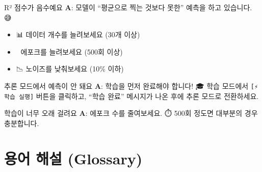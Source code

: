 \documentclass[11pt,a4paper]{article}
\begin{document}
\begin{faqbox}{R² 점수가 음수예요}
\textbf{A}: 모델이 ``평균으로 찍는 것보다 못한'' 예측을 하고 있습니다. 😅
\begin{itemize}
    \item 📊 데이터 개수를 늘려보세요 (30개 이상)
    \item 🔄 에포크를 늘려보세요 (500회 이상)
    \item 📉 노이즈를 낮춰보세요 (10\% 이하)
\end{itemize}
\end{faqbox}

\begin{faqbox}{추론 모드에서 예측이 안 돼요}
\textbf{A}: 학습을 먼저 완료해야 합니다! 🎓
학습 모드에서 \texttt{[⚡ 학습 실행]} 버튼을 클릭하고, 
``학습 완료'' 메시지가 나온 후에 추론 모드로 전환하세요.
\end{faqbox}

\begin{faqbox}{학습이 너무 오래 걸려요}
\textbf{A}: 에포크 수를 줄여보세요. ⏱️
500회 정도면 대부분의 경우 충분합니다.
\end{faqbox}

\section{용어 해설 (Glossary)}
\end{document}
